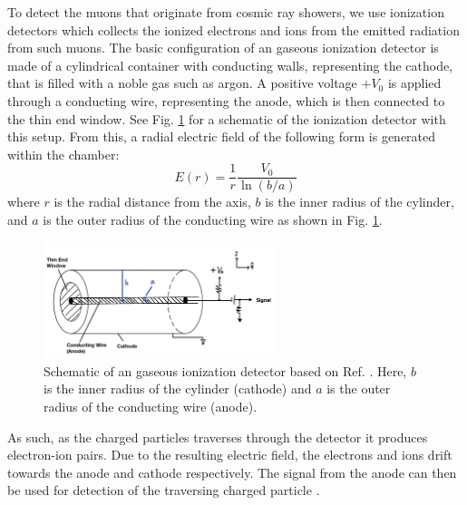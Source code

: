 \documentclass[a4paper]{report}
\numberwithin{equation}{section}
\begin{document}
To detect the muons that originate from cosmic ray showers, we use ionization detectors which collects the ionized electrons and ions 
from the emitted radiation from such muons. The basic configuration of an gaseous ionization detector is 
made of a cylindrical container with conducting walls, representing the cathode, that is filled with a noble gas such as argon. A positive voltage 
$+V_0$ is applied through a conducting wire, representing the anode, which is then connected to the thin end window.
See Fig. \ref{fig:ionization_chamber_schematic} 
for a schematic of the ionization detector with this setup. From this, a radial electric field of the following form is generated within the chamber:
\begin{equation}
	E(r) = \frac{1}{r}\frac{V_0}{\ln (b / a)}
\end{equation}
where $r$ is the radial distance from the axis, $b$ is the inner radius of the cylinder, and $a$ is the outer radius of the conducting 
wire as shown in Fig. \ref{fig:ionization_chamber_schematic}. \par 

\begin{figure}[!h]
	\centering
	\includegraphics[width=0.6\textwidth]{ionization_chamber_schematic.png}
	\caption{Schematic of an gaseous ionization detector based on Ref. \cite{Leo1994}. Here, $b$ is the inner radius of the cylinder (cathode) and $a$ is the outer radius 
	of the conducting wire (anode).}
	\label{fig:ionization_chamber_schematic}	
\end{figure}

As such, as the charged particles traverses through the detector it produces electron-ion pairs. Due to the resulting electric field, 
the electrons and ions drift towards the anode and cathode respectively. The signal from the anode can then be used for detection of the 
traversing charged particle \cite{Leo1994}. \par 
\end{document}
